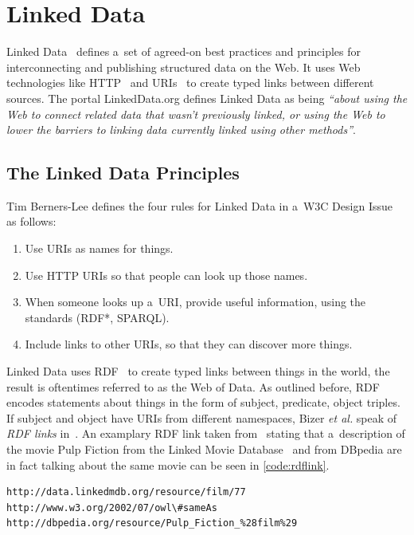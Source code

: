 \section{Linked Data}
Linked Data~\cite{BernersLee2006} defines a~set of agreed-on best practices and
principles for interconnecting and publishing structured data on the Web.
It uses Web technologies like HTTP~\cite{Fielding1999} and URIs~\cite{BernersLee2005}
to create typed links between different sources.
The portal LinkedData.org defines Linked Data as being
\textit{``about using the Web to connect related data that wasn't previously linked,
or using the Web to lower the barriers to linking data currently linked using other methods''}. 

\subsection{The Linked Data Principles}
Tim Berners-Lee defines the four rules for Linked Data in a~W3C Design Issue~\cite{BernersLee2006} as follows:
\begin{enumerate}
\item Use URIs as names for things.
\item Use HTTP URIs so that people can look up those names.
\item When someone looks up a~URI, provide useful information, using the standards (RDF*, SPARQL).
\item Include links to other URIs, so that they can discover more things.
\end{enumerate}

Linked Data uses RDF~\cite{Klyne2004} to create typed links between things in the world,
the result is oftentimes referred to as the Web of Data.
As outlined before, RDF encodes statements about things in the form of
subject, predicate, object triples.
If subject and object have URIs from different namespaces,
Bizer \emph{et al.} speak of \emph{RDF links} in~\cite{Bizer2007}.
An examplary RDF link taken from~\cite{Bizer2009} stating that a~description of the movie Pulp Fiction
from the Linked Movie Database~\cite{Hassanzadeh2009} and from DBpedia are in fact talking about the same movie
can be seen in \autoref{code:rdflink}.

\begin{lstlisting}[caption={[Exemplary RDF link.]{Exemplary RDF link stating that a~description of the movie Pulp Fiction from the Linked Movie Database~\cite{Hassanzadeh2009} and from DBpedia are in fact talking about the same movie.}},label={code:rdflink}]
http://data.linkedmdb.org/resource/film/77
http://www.w3.org/2002/07/owl\#sameAs
http://dbpedia.org/resource/Pulp_Fiction_%28film%29
\end{lstlisting}

